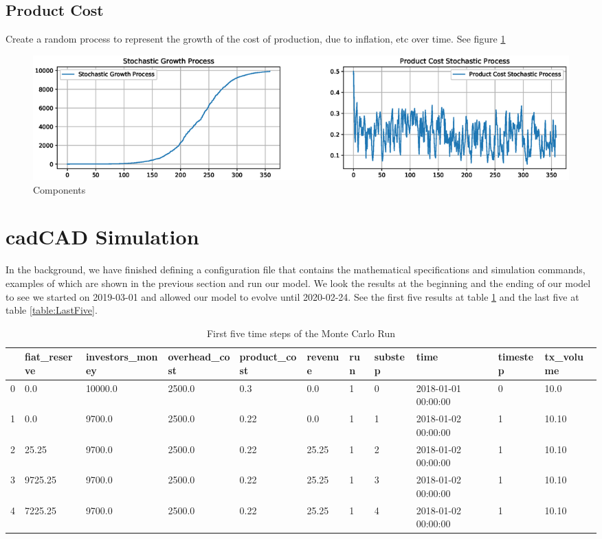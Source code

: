 \documentclass[12pt]{extarticle}
\begin{document}
\subsection{Product Cost}
Create a random process to represent the growth of the cost of production, due to inflation, etc over time. See figure \ref{fig:components}
\\
\begin{figure}[h]
    \centering
    \includegraphics[width=1\textwidth]{images/components.eps}
    \caption{Components}
    \label{fig:components}
\end{figure}

\section{cadCAD Simulation}
In the background, we have finished defining a configuration file that contains the mathematical specifications and simulation commands, examples of which are shown in the previous section and run our model.
We look the results at the beginning and the ending of our model to see we started on 2019-03-01 and allowed our model to evolve until 2020-02-24. See the first five results at table \ref{table:FirstFive} and the last five at table \ref{table:LastFive}. \\ 


\begin{table}[h]
 \centering
\begin{adjustbox}{max width=\textwidth}
\begin{tabular}{@{}lllllllllll@{}}
\toprule
  & fiat\_reserve      & investors\_money & overhead\_cost & product\_cost       & revenue            & run & substep & time                & timestep & tx\_volume         \\ \midrule
0 & 0.0                & 10000.0          & 2500.0         & 0.3                 & 0.0                & 1   & 0       & 2018-01-01 00:00:00 & 0        & 10.0               \\
1 & 0.0                & 9700.0           & 2500.0         & 0.22 & 0.0                & 1   & 1       & 2018-01-02 00:00:00 & 1        & 10.10 \\
2 & 25.25 & 9700.0           & 2500.0         & 0.22 & 25.25 & 1   & 2       & 2018-01-02 00:00:00 & 1        & 10.10 \\
3 & 9725.25  & 9700.0           & 2500.0         & 0.22 & 25.25 & 1   & 3       & 2018-01-02 00:00:00 & 1        & 10.10 \\
4 & 7225.25  & 9700.0           & 2500.0         & 0.22 & 25.25& 1   & 4       & 2018-01-02 00:00:00 & 1        & 10.10 \\ \bottomrule
\end{tabular}
\end{adjustbox}
\caption{First five time steps of the Monte Carlo Run}
\label{table:FirstFive}
\end{table}
\end{document}
